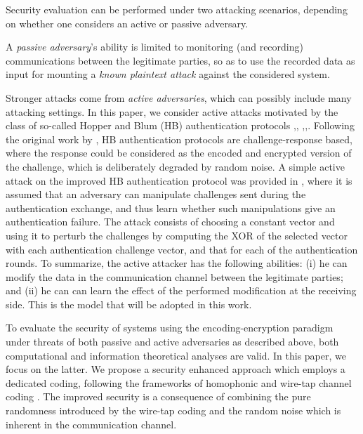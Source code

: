 \documentclass{article}[11pt]
\begin{document}
Security evaluation can be performed under two attacking scenarios, depending
on whether one considers an active or passive adversary.

A {\em passive adversary}'s ability is limited to monitoring (and recording)
communications between the legitimate parties, so as to use the recorded data
as input for mounting a {\em known plaintext attack} against the considered
system.

Stronger attacks come from {\em active adversaries}, which can possibly
include many attacking settings. In this paper, we consider active attacks
motivated by the class of so-called Hopper and Blum (HB) authentication
protocols \cite{hopper-ASIACRYPT2001},\cite{juels-CRYPTO2005},
\cite{katz-EUROCRYPT2006},\cite{gilbert-EUROCRYPT2008},\cite{gilbert-FC2008}.
Following the original work by \cite{hopper-ASIACRYPT2001}, HB authentication
protocols are challenge-response based, where the response could be considered
as the encoded and encrypted version of the challenge, which is deliberately
degraded by random noise. A simple active attack on the improved HB
authentication protocol \cite{katz-EUROCRYPT2006} was provided in
\cite{gilbert}, where it is assumed that an adversary can manipulate
challenges sent during the authentication exchange, and thus learn whether
such manipulations give an authentication failure. The attack consists of
choosing a constant vector and using it to perturb the challenges by computing
the XOR of the selected vector with each authentication challenge vector, and
that for each of the authentication rounds. To summarize, the active attacker
has the following abilities: (i) he can modify the data in the communication
channel between the legitimate parties; and (ii) he can can learn the effect
of the performed modification at the receiving side.
This is the model that will be adopted in this work.

To evaluate the security of systems using the encoding-encryption
paradigm under threats of both passive and active adversaries as
described above, both computational and information theoretical
analyses are valid. In this paper, we focus on the latter. We
propose a security enhanced approach which employs a dedicated
coding, following the frameworks of homophonic \cite{jendal,
massey-1994, ryabko} and wire-tap channel coding
\cite{wyner,thangaraj-IEEE-IT-2007}. The improved security is a
consequence of combining the pure randomness introduced by the
wire-tap coding and the random noise which is inherent in the
communication channel.
\end{document}
